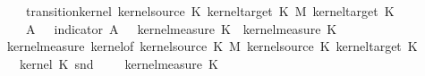 \begin{isabellebody}
\ \ \ \ \ {\isachardoublequoteopen}transition{\isacharunderscore}{\kern0pt}kernel\ {\isacharparenleft}{\kern0pt}kernel{\isacharunderscore}{\kern0pt}source\ K{\isacharunderscore}{\kern0pt}{}{\isacharparenright}{\kern0pt}\ {\isacharparenleft}{\kern0pt}kernel{\isacharunderscore}{\kern0pt}target\ K{\isacharunderscore}{\kern0pt}{}\ {\isasymOtimes}\isactrlsub M\ kernel{\isacharunderscore}{\kern0pt}target\ K{\isacharunderscore}{\kern0pt}{}{\isacharparenright}{\kern0pt}\isanewline
\ \ \ \ {\isacharparenleft}{\kern0pt}{\isasymlambda}{\isasymomega}\ A{\isachardot}{\kern0pt}\ {\isasymintegral}\isactrlsup {\isacharplus}{\kern0pt}{\isasymomega}\ {\isacharparenleft}{\kern0pt}{\isasymintegral}\isactrlsup {\isacharplus}{\kern0pt}{\isasymomega}\ indicator\ A\ {\isacharparenleft}{\kern0pt}{\isasymomega}\ {\isasymomega}\ {\isasympartial}kernel{\isacharunderscore}{\kern0pt}measure\ K{\isacharunderscore}{\kern0pt}{}\ {\isasymomega}\ {\isasympartial}kernel{\isacharunderscore}{\kern0pt}measure\ K{\isacharunderscore}{\kern0pt}{}\ {\isasymomega}\isanewline
%
\isadelimproof
%
\endisadelimproof
%
\isatagproof
{}\isamarkupfalse%
\ {\isacharminus}{\kern0pt}\isanewline
\ \ \isamarkupfalse%
\ {}{\isacharcolon}{\kern0pt}\ {\isachardoublequoteopen}kernel{\isacharunderscore}{\kern0pt}measure\ {\isacharparenleft}{\kern0pt}kernel{\isacharunderscore}{\kern0pt}of\ {\isacharparenleft}{\kern0pt}kernel{\isacharunderscore}{\kern0pt}source\ K{\isacharunderscore}{\kern0pt}{}\ {\isasymOtimes}\isactrlsub M\ kernel{\isacharunderscore}{\kern0pt}source\ K{\isacharunderscore}{\kern0pt}{}{\isacharparenright}{\kern0pt}\ {\isacharparenleft}{\kern0pt}kernel{\isacharunderscore}{\kern0pt}target\ K{\isacharunderscore}{\kern0pt}{}{\isacharparenright}{\kern0pt}\isanewline
\ \ \ {\isacharparenleft}{\kern0pt}{\isasymlambda}{\isasymomega}{\isachardot}{\kern0pt}\ kernel\ K{\isacharunderscore}{\kern0pt}{}\ {\isacharparenleft}{\kern0pt}snd\ {\isasymomega}{\isacharparenright}{\kern0pt}{\isacharparenright}{\kern0pt}{\isacharparenright}{\kern0pt}\ {\isacharparenleft}{\kern0pt}{\isasymomega}\ {\isasymomega}\ {\isacharequal}{\kern0pt}\ kernel{\isacharunderscore}{\kern0pt}measure\ K{\isacharunderscore}{\kern0pt}{}\ {\isasymomega}\isanewline

\end{isabellebody}
